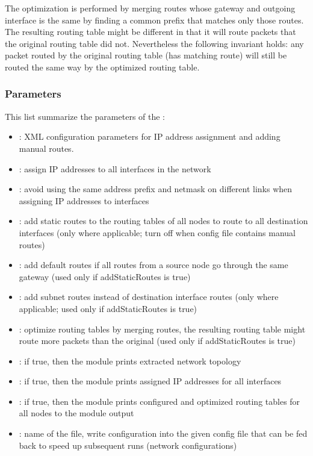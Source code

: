 The optimization is performed by merging routes whose gateway and
outgoing interface is the same by finding a common prefix that
matches only those routes. The resulting routing table might be
different in that it will route packets that the original routing table
did not. Nevertheless the following invariant holds: any packet routed
by the original routing table (has matching route) will still be routed
the same way by the optimized routing table.

\subsubsection*{Parameters}

This list summarize the parameters of the :

\begin{itemize}
  \item {}: XML configuration parameters for IP address assignment
    and adding manual routes.
  \item {}: assign IP addresses to all interfaces in the network
  \item {}: avoid using the same address prefix and
    netmask on different links when assigning IP addresses to interfaces
  \item {}: add static routes to the routing tables of all nodes
    to route to all destination interfaces (only where applicable; turn off when
    config file contains manual routes)
  \item {}: add default routes if all routes from a source node
     go through the same gateway (used only if addStaticRoutes is true)
  \item {}: add subnet routes instead of destination interface routes
    (only where applicable; used only if addStaticRoutes is true)
  \item {}: optimize routing tables by merging routes, the
    resulting routing table might route more packets than the original
    (used only if addStaticRoutes is true)
  \item {}: if true, then the module prints extracted network topology
  \item {}: if true, then the module prints assigned IP addresses
    for all interfaces
  \item {}: if true, then the module prints configured and optimized
    routing tables for all nodes to the module output
  \item {}: name of the file, write configuration into the given
    config file that can be fed back to speed up subsequent runs (network configurations)
\end{itemize}

